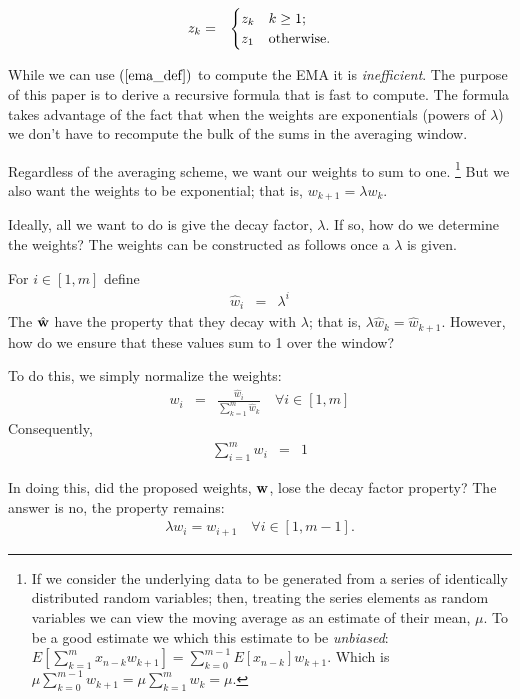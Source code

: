 \documentclass{article}
\begin{document}
\begin{eqnarray}
 z_{k} & = & \begin{cases}
     z_{k} & k \ge 1; \cr
     z_1 & \text{otherwise}. \cr
 \end{cases} \label{o:var_extend}
\end{eqnarray}

While we can use $(\ref{ema_def})$ to compute the EMA it is {\em inefficient\/}. 
The purpose of this
paper is to derive a recursive formula that is fast to compute.
The formula takes advantage of the fact that when the weights are exponentials
(powers of $\lambda$) we don't have to recompute the bulk of the sums in the 
averaging window.

Regardless of the averaging scheme, we want our weights to sum to one.%
\footnote{If we consider the underlying data to be generated from a series of identically distributed random
variables; then, treating the series elements as random variables we can view 
the moving average as an estimate of their mean, $\mu$. 
To be a good estimate we which this estimate to be {\em unbiased\/}:
$E\left[\sum_{k=1}^m x_{n-k} w_{k+1}\right] = \sum_{k=0}^{m-1} E[x_{n-k}]w_{k+1}$.
Which is $\mu \sum_{k=0}^{m-1} w_{k+1} = \mu \sum_{k=1}^{m} w_k = \mu$.}
But we also want the weights to be exponential; that is, $w_{k+1} = \lambda w_{k}$.

Ideally, all we want to do is give the decay factor, $\lambda$. If so, 
how do we determine the weights?
The weights can be constructed as follows once a $\lambda$ is given.

For $i \in [1, m]$ define
\begin{eqnarray}
    {\hat w}_i & = & \lambda^i 
\end{eqnarray}
The ${\hat {\bf w}}$ have the property that they decay with $\lambda$;
that is, $\lambda {\hat w}_{k} = {\hat w}_{k+1}$. However, how do we ensure that
these values sum to 1 over the window? 

To do this, we simply normalize the weights:
\begin{eqnarray}
w_i & = &  \frac{{\hat w}_i}{\sum_{k=1}^m {\hat w}_k} \quad \forall i \in [1, m]
\end{eqnarray}
Consequently,
\begin{eqnarray}
    \sum_{i=1}^m w_i & = & 1 \label{o:weights_normalized}
\end{eqnarray}

In doing this, did the proposed weights, ${\bf w}$, lose the decay factor
property? The answer is no, the property remains: 
\begin{eqnarray}
    \lambda w_{i} = w_{i+1} \quad \forall i \in [1, m-1]. \label{o:weights_power}
\end{eqnarray}
\end{document}
